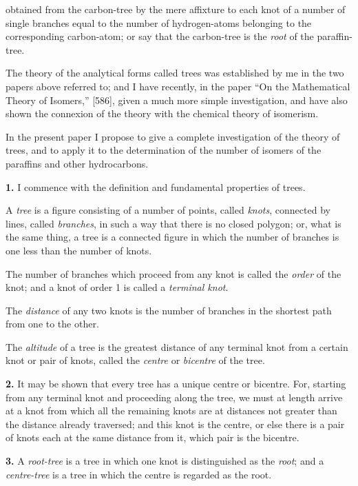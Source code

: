 \documentclass[11pt,a4paper]{article}
\begin{document}
{obtained from the carbon-tree by the mere affixture to each knot of a number of single branches equal to the number of hydrogen-atoms belonging to the corresponding carbon-atom; or say that the carbon-tree is the \textit{root} of the paraffin-tree.

The theory of the analytical forms called trees was established by me in the two papers above referred to; and I have recently, in the paper ``On the Mathematical Theory of Isomers,'' [586], given a much more simple investigation, and have also shown the connexion of the theory with the chemical theory of isomerism.

In the present paper I propose to give a complete investigation of the theory of trees, and to apply it to the determination of the number of isomers of the paraffins and other hydrocarbons.

\medskip
\noindent\textbf{1.}
I commence with the definition and fundamental properties of trees.

A \textit{tree} is a figure consisting of a number of points, called \textit{knots}, connected by lines, called \textit{branches}, in such a way that there is no closed polygon; or, what is the same thing, a tree is a connected figure in which the number of branches is one less than the number of knots.

The number of branches which proceed from any knot is called the \textit{order} of the knot; and a knot of order 1 is called a \textit{terminal knot}.

The \textit{distance} of any two knots is the number of branches in the shortest path from one to the other.

The \textit{altitude} of a tree is the greatest distance of any terminal knot from a certain knot or pair of knots, called the \textit{centre} or \textit{bicentre} of the tree.

\medskip
\noindent\textbf{2.}
It may be shown that every tree has a unique centre or bicentre. For, starting from any terminal knot and proceeding along the tree, we must at length arrive at a knot from which all the remaining knots are at distances not greater than the distance already traversed; and this knot is the centre, or else there is a pair of knots each at the same distance from it, which pair is the bicentre.

\medskip
\noindent\textbf{3.}
A \textit{root-tree} is a tree in which one knot is distinguished as the \textit{root}; and a \textit{centre-tree} is a tree in which the centre is regarded as the root.

}
\end{document}
